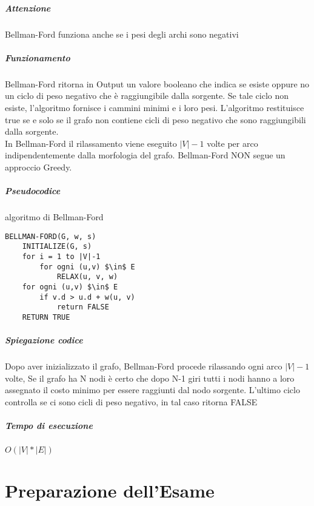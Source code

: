 \documentclass[12pt, a4paper, openany]{book}
\begin{document}
\paragraph{Attenzione}
Bellman-Ford funziona anche se i pesi degli archi sono negativi


\paragraph{Funzionamento}
Bellman-Ford ritorna in Output un valore booleano che indica se esiste oppure no un ciclo di peso
negativo che è raggiungibile dalla sorgente. Se tale ciclo non esiste, l'algoritmo fornisce i cammini minimi
e i loro pesi. L'algoritmo restituisce true se e solo se il grafo non contiene cicli di peso negativo che sono
raggiungibili dalla sorgente.\\
In Bellman-Ford il rilassamento viene eseguito $|V|-1$ volte per arco indipendentemente dalla morfologia del grafo.
Bellman-Ford NON segue un approccio Greedy.

\paragraph{Pseudocodice} algoritmo di Bellman-Ford
\begin{lstlisting}[mathescape=true]
BELLMAN-FORD(G, w, s)
    INITIALIZE(G, s)
    for i = 1 to |V|-1
        for ogni (u,v) $\in$ E
            RELAX(u, v, w)
    for ogni (u,v) $\in$ E
        if v.d > u.d + w(u, v)
            return FALSE
    RETURN TRUE
\end{lstlisting}

\paragraph{Spiegazione codice}
Dopo aver inizializzato il grafo, Bellman-Ford procede rilassando ogni arco $|V|-1$ volte,
Se il grafo ha N nodi è certo che dopo N-1 giri tutti i nodi hanno a loro assegnato il costo minimo per essere raggiunti dal nodo sorgente.
L'ultimo ciclo controlla se ci sono cicli di peso negativo, in tal caso ritorna FALSE

\paragraph{Tempo di esecuzione}
\begin{center}
    $O(|V|*|E|)$
\end{center}

\chapter{Preparazione dell'Esame}
\end{document}
